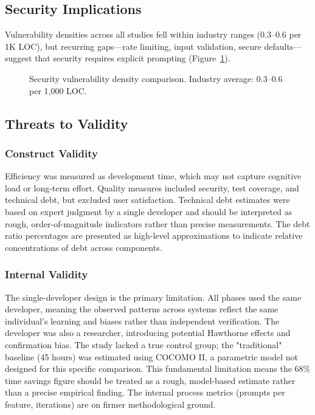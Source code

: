 \documentclass[sigconf]{acmart}
\begin{document}
\subsection{Security Implications}

Vulnerability densities across all studies fell within industry ranges (0.3–0.6 per 1K LOC), but recurring gaps—rate limiting, input validation, secure defaults—suggest that security requires explicit prompting (Figure~\ref{fig:security}).

\begin{figure}[htbp]
\centering
{}
\caption{Security vulnerability density comparison. Industry average: 0.3–0.6 per 1,000 LOC.}
\label{fig:security}
\end{figure}

\subsection{Threats to Validity}

\subsubsection{Construct Validity}
Efficiency was measured as development time, which may not capture cognitive load or long-term effort. Quality measures included security, test coverage, and technical debt, but excluded user satisfaction. Technical debt estimates were based on expert judgment by a single developer and should be interpreted as rough, order-of-magnitude indicators rather than precise measurements. The debt ratio percentages are presented as high-level approximations to indicate relative concentrations of debt across components.

\subsubsection{Internal Validity}
The single-developer design is the primary limitation. All phases used the same developer, meaning the observed patterns across systems reflect the same individual's learning and biases rather than independent verification. The developer was also a researcher, introducing potential Hawthorne effects and confirmation bias. The study lacked a true control group; the "traditional" baseline (45 hours) was estimated using COCOMO II, a parametric model not designed for this specific comparison. This fundamental limitation means the 68\% time savings figure should be treated as a rough, model-based estimate rather than a precise empirical finding. The internal process metrics (prompts per feature, iterations) are on firmer methodological ground.
\end{document}
